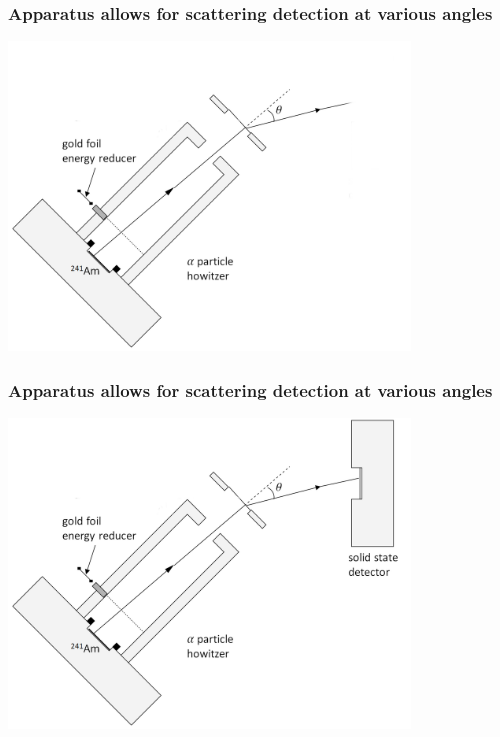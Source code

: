 \documentclass{beamer}
\begin{document}
\begin{frame}
  \frametitle{Apparatus allows for scattering detection at various angles}
  \begin{center}
  \includegraphics[width=0.8\textwidth]{apparatus-phi-detect}
\end{center}
\end{frame}

\begin{frame}
  \frametitle{Apparatus allows for scattering detection at various angles}
  \begin{center}
  \includegraphics[width=0.8\textwidth]{apparatus-phi}
\end{center}
\end{frame}
\end{document}
